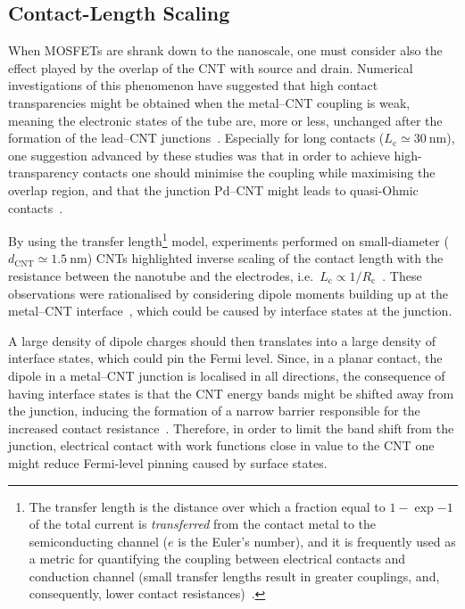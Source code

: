 \subsection{Contact-Length Scaling}
When \glspl{MOSFET} are shrank down to the nanoscale, one must consider also the effect played by the overlap of the \gls{CNT} with source and drain. Numerical investigations of this phenomenon have suggested that high contact transparencies might be obtained when the metal--\gls{CNT} coupling is weak, meaning the electronic states of the tube are, more or less, unchanged after the formation of the lead--\gls{CNT} junctions~\cite{fediai2015electron, teichert2019improved, fediai2016towards}. Especially for long contacts ($L_\textrm{c}\simeq\SI{30}{\nano\metre}$), one suggestion advanced by these studies was that in order to achieve high-transparency contacts one should minimise the coupling while maximising the overlap region, and that the junction Pd--\gls{CNT} might leads to quasi-Ohmic contacts~\cite{liu2017scaling}.

By using the transfer length\footnote[2]{The transfer length is the distance over which a fraction equal to $1-\exp{-1}$ of the total current is \textit{transferred} from the contact metal to the semiconducting channel ($e$ is the Euler's number), and it is frequently used as a metric for quantifying the coupling between electrical contacts and conduction channel (small transfer lengths result in greater couplings, and, consequently, lower contact resistances)~\cite{saraswat2021materials}.} model, experiments performed on small-diameter ($d_\textrm{CNT}\simeq\SI{1.5}{\nano\metre}$) \glspl{CNT} highlighted inverse scaling of the contact length with the resistance between the nanotube and the electrodes, i.e.\ $L_\textrm{c}\propto1/R_\textrm{c}$~\cite{purewal2007scaling, franklin2010length}. These observations were rationalised by considering dipole moments building up at the metal--\gls{CNT} interface~\cite{leonard2000role}, which could be caused by interface states at the junction.

A large density of dipole charges should then translates into a large density of interface states, which could pin the Fermi level. Since, in a planar contact, the dipole in a metal--\gls{CNT} junction is localised in all directions, the consequence of having interface states is that the \gls{CNT} energy bands might be shifted away from the junction, inducing the formation of a narrow barrier responsible for the increased contact resistance~\cite{svensson2011schottky}. Therefore, in order to limit the band shift from the junction, electrical contact with work functions close in value to the \gls{CNT} one might reduce Fermi-level pinning caused by surface states.

